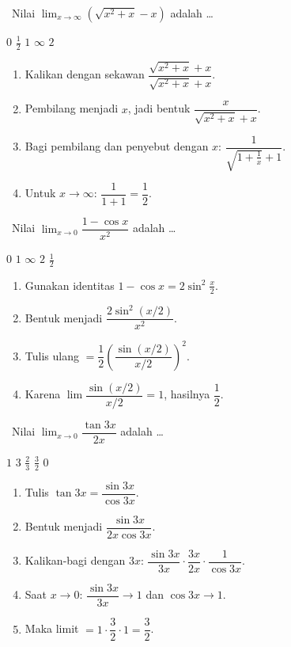 \documentclass[11pt,a4paper]{exam}
\newenvironment{langkah}{%
  \begin{enumerate}[label=\textbf{Langkah \arabic*:},leftmargin=2.6em,
    itemsep=2pt,topsep=2pt]}{\end{enumerate}}
\newcommand{\Adv}{{\footnotesize\textsf{\textcolor{oranye}{[Advanced]}}}\ }
\newcommand{\Exp}{{\footnotesize\textsf{\textcolor{ungu}{[Expert]}}}\ }
\begin{document}
\begin{questions}
\question \Adv Nilai $\displaystyle\lim_{x\to\infty}\left(\sqrt{x^{2}+x}-x\right)$ adalah \dots
\begin{choices}
\choice $0$ \CorrectChoice $\tfrac{1}{2}$ \choice $1$ \choice $\infty$ \choice $2$
\end{choices}
\begin{solution}
\begin{langkah}
\item Kalikan dengan sekawan $\dfrac{\sqrt{x^{2}+x}+x}{\sqrt{x^{2}+x}+x}$.
\item Pembilang menjadi $x$, jadi bentuk $\dfrac{x}{\sqrt{x^{2}+x}+x}$.
\item Bagi pembilang dan penyebut dengan $x$: $\dfrac{1}{\sqrt{1+\frac1x}+1}$.
\item Untuk $x\to\infty$: $\dfrac{1}{1+1} = \dfrac{1}{2}$.
\end{langkah}
\end{solution}

\question \Adv Nilai $\displaystyle\lim_{x\to 0}\dfrac{1-\cos x}{x^{2}}$ adalah \dots
\begin{choices}
\choice $0$ \choice $1$ \choice $\infty$ \choice $2$ \CorrectChoice $\tfrac{1}{2}$
\end{choices}
\begin{solution}
\begin{langkah}
\item Gunakan identitas $1-\cos x = 2\sin^{2}\tfrac{x}{2}$.
\item Bentuk menjadi $\dfrac{2\sin^{2}(x/2)}{x^{2}}$.
\item Tulis ulang $= \dfrac{1}{2}\left(\dfrac{\sin(x/2)}{x/2}\right)^{2}$.
\item Karena $\lim \dfrac{\sin(x/2)}{x/2} = 1$, hasilnya $\dfrac{1}{2}$.
\end{langkah}
\end{solution}

\question \Exp Nilai $\displaystyle\lim_{x\to 0}\dfrac{\tan 3x}{2x}$ adalah \dots
\begin{choices}
\choice $1$ \choice $3$ \choice $\tfrac{2}{3}$ \CorrectChoice $\tfrac{3}{2}$ \choice $0$
\end{choices}
\begin{solution}
\begin{langkah}
\item Tulis $\tan 3x = \dfrac{\sin 3x}{\cos 3x}$.
\item Bentuk menjadi $\dfrac{\sin 3x}{2x\cos 3x}$.
\item Kalikan-bagi dengan $3x$: $\dfrac{\sin 3x}{3x}\cdot\dfrac{3x}{2x}\cdot\dfrac{1}{\cos 3x}$.
\item Saat $x\to 0$: $\dfrac{\sin 3x}{3x}\to 1$ dan $\cos 3x \to 1$.
\item Maka limit $= 1\cdot\dfrac{3}{2}\cdot 1 = \dfrac{3}{2}$.
\end{langkah}
\end{solution}


\end{questions}
\end{document}
